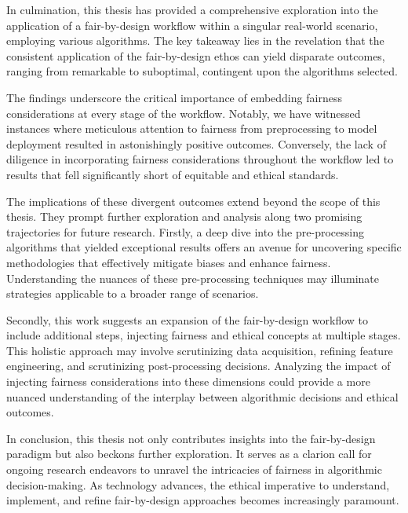 \documentclass[12pt,a4paper,openright,twoside]{book}
\begin{document}
In culmination, this thesis has provided a comprehensive exploration into the application of a fair-by-design workflow within a singular real-world scenario, employing various algorithms. The key takeaway lies in the revelation that the consistent application of the fair-by-design ethos can yield disparate outcomes, ranging from remarkable to suboptimal, contingent upon the algorithms selected.

The findings underscore the critical importance of embedding fairness considerations at every stage of the workflow. Notably, we have witnessed instances where meticulous attention to fairness from preprocessing to model deployment resulted in astonishingly positive outcomes. Conversely, the lack of diligence in incorporating fairness considerations throughout the workflow led to results that fell significantly short of equitable and ethical standards.

The implications of these divergent outcomes extend beyond the scope of this thesis. They prompt further exploration and analysis along two promising trajectories for future research. Firstly, a deep dive into the pre-processing algorithms that yielded exceptional results offers an avenue for uncovering specific methodologies that effectively mitigate biases and enhance fairness. Understanding the nuances of these pre-processing techniques may illuminate strategies applicable to a broader range of scenarios.

Secondly, this work suggests an expansion of the fair-by-design workflow to include additional steps, injecting fairness and ethical concepts at multiple stages. This holistic approach may involve scrutinizing data acquisition, refining feature engineering, and scrutinizing post-processing decisions. Analyzing the impact of injecting fairness considerations into these dimensions could provide a more nuanced understanding of the interplay between algorithmic decisions and ethical outcomes.

In conclusion, this thesis not only contributes insights into the fair-by-design paradigm but also beckons further exploration. It serves as a clarion call for ongoing research endeavors to unravel the intricacies of fairness in algorithmic decision-making. As technology advances, the ethical imperative to understand, implement, and refine fair-by-design approaches becomes increasingly paramount.



\backmatter




\end{document}
